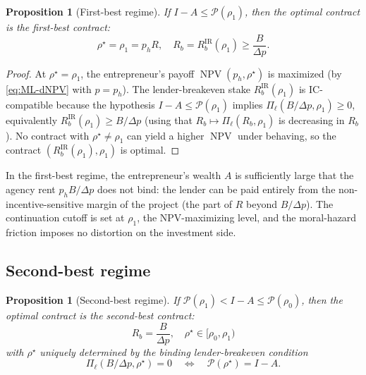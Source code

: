 \documentclass[11pt,a4paper,oneside]{book}
\def\leq{\leqslant}
\def\geq{\geqslant}
\DeclareMathOperator{\NPV}{NPV}
\newcommand{\IR}{\mathrm{IR}}
\theoremstyle{plain}
\newtheorem{proposition}[theorem]{Proposition}
\theoremstyle{definition}
\theoremstyle{remark}
\numberwithin{equation}{chapter}
\begin{document}
\begin{proposition}[First-best regime]\label{prop:ML-FB}
If $I - A \leq \mathcal{P}(\rho_1)$, then the optimal contract is the \emph{first-best} contract:
\begin{equation*}
  \rho^\star = \rho_1 = p_h R,
  \quad
  R_b = R_b^{\IR}(\rho_1) \geq \frac{B}{\Delta p}.
\end{equation*}
\end{proposition}

\begin{proof}
At $\rho^\star = \rho_1$, the entrepreneur's payoff $\NPV(p_h, \rho^\star)$ is maximized (by \eqref{eq:ML-dNPV} with $p = p_h$).
The lender-breakeven stake $R_b^{\IR}(\rho_1)$ is IC-compatible because the hypothesis $I - A \leq \mathcal{P}(\rho_1)$ implies $\Pi_\ell(B/\Delta p, \rho_1) \geq 0$, equivalently $R_b^{\IR}(\rho_1) \geq B/\Delta p$ (using that $R_b \mapsto \Pi_\ell(R_b, \rho_1)$ is decreasing in $R_b$).
No contract with $\rho^\star \neq \rho_1$ can yield a higher $\NPV$ under behaving, so the contract $(R_b^{\IR}(\rho_1), \rho_1)$ is optimal.
\end{proof}

In the first-best regime, the entrepreneur's wealth $A$ is sufficiently large that the agency rent $p_h B/\Delta p$ does not bind: the lender can be paid entirely from the non-incentive-sensitive margin of the project (the part of $R$ beyond $B/\Delta p$).
The continuation cutoff is set at $\rho_1$, the NPV-maximizing level, and the moral-hazard friction imposes no distortion on the investment side.

\subsection{Second-best regime}

\begin{proposition}[Second-best regime]\label{prop:ML-SB}
If $\mathcal{P}(\rho_1) < I - A \leq \mathcal{P}(\rho_0)$, then the optimal contract is the \emph{second-best} contract:
\begin{equation*}
  R_b = \frac{B}{\Delta p},
  \quad
  \rho^\star \in [\rho_0, \rho_1)
\end{equation*}
with $\rho^\star$ uniquely determined by the binding lender-breakeven condition
\begin{equation}\label{eq:ML-rho-star-SB}
  \Pi_\ell(B/\Delta p, \rho^\star) = 0
  \quad\Longleftrightarrow\quad
  \mathcal{P}(\rho^\star) = I - A.
\end{equation}
\end{proposition}
\end{document}
